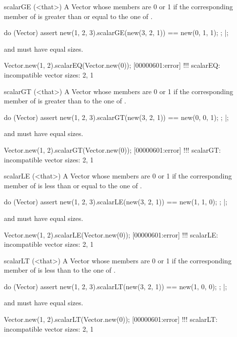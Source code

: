 \begin{urbiscriptapi}
\item[scalarGE](<that>)%
  A Vector whose members are 0 or 1 if the corresponding member of \this is
  greater than or equal to the one of \that.
\begin{urbiscript}
do (Vector)
{
  assert
  {
    new(1, 2, 3).scalarGE(new(3, 2, 1)) == new(0, 1, 1);
  };
}|;
\end{urbiscript}
  \this and \that must have equal sizes.
\begin{urbiscript}
Vector.new(1, 2).scalarEQ(Vector.new(0));
[00000601:error] !!! scalarEQ: incompatible vector sizes: 2, 1
\end{urbiscript}

\item[scalarGT](<that>)%
  A Vector whose members are 0 or 1 if the corresponding member of \this is
  greater than to the one of \that.
\begin{urbiscript}
do (Vector)
{
  assert
  {
    new(1, 2, 3).scalarGT(new(3, 2, 1)) == new(0, 0, 1);
  };
}|;
\end{urbiscript}
  \this and \that must have equal sizes.
\begin{urbiscript}
Vector.new(1, 2).scalarGT(Vector.new(0));
[00000601:error] !!! scalarGT: incompatible vector sizes: 2, 1
\end{urbiscript}

\item[scalarLE](<that>)%
  A Vector whose members are 0 or 1 if the corresponding member of \this is
  less than or equal to the one of \that.
\begin{urbiscript}
do (Vector)
{
  assert
  {
    new(1, 2, 3).scalarLE(new(3, 2, 1)) == new(1, 1, 0);
  };
}|;
\end{urbiscript}
  \this and \that must have equal sizes.
\begin{urbiscript}
Vector.new(1, 2).scalarLE(Vector.new(0));
[00000601:error] !!! scalarLE: incompatible vector sizes: 2, 1
\end{urbiscript}

\item[scalarLT](<that>)%
  A Vector whose members are 0 or 1 if the corresponding member of \this is
  less than to the one of \that.
\begin{urbiscript}
do (Vector)
{
  assert
  {
    new(1, 2, 3).scalarLT(new(3, 2, 1)) == new(1, 0, 0);
  };
}|;
\end{urbiscript}
  \this and \that must have equal sizes.
\begin{urbiscript}
Vector.new(1, 2).scalarLT(Vector.new(0));
[00000601:error] !!! scalarLT: incompatible vector sizes: 2, 1
\end{urbiscript}


\end{urbiscriptapi}
